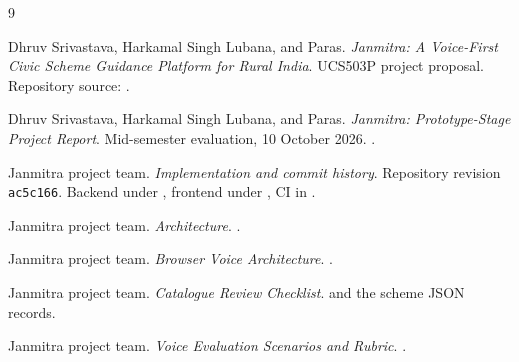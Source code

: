 \documentclass[11pt,a4paper,oneside]{report}
\newcommand{\Revision}{ac5c166}
\begin{document}
\clearpage
{}
{}
\begin{thebibliography}{9}

Dhruv Srivastava, Harkamal Singh Lubana, and Paras.
\emph{Janmitra: A Voice-First Civic Scheme Guidance Platform for Rural India}.
UCS503P project proposal. Repository source: .

Dhruv Srivastava, Harkamal Singh Lubana, and Paras.
\emph{Janmitra: Prototype-Stage Project Report}. Mid-semester evaluation,
10 October 2026. .

Janmitra project team. \emph{Implementation and commit history}.
Repository revision \texttt{\Revision}. Backend under ,
frontend under , CI in .

Janmitra project team. \emph{Architecture}. .

Janmitra project team. \emph{Browser Voice Architecture}.
.

Janmitra project team. \emph{Catalogue Review Checklist}.
 and the scheme JSON records.

Janmitra project team. \emph{Voice Evaluation Scenarios and Rubric}.
.

\end{thebibliography}
\end{document}
